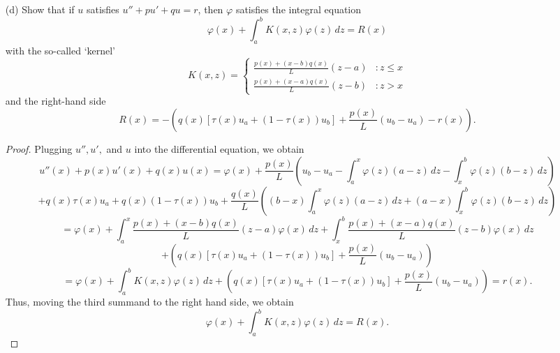 \documentclass[10pt]{article}
\begin{document}
\begin{itemize}
\item[(d)] Show that if $ u $ satisfies $ u'' + p u' + q u = r  $, then $ \varphi $ satisfies the integral equation  $$
\varphi(x) + \int_{a}^b K(x,z) \varphi(z) \, dz = R(x)
$$ with the so-called `kernel'
 \begin{displaymath}
   K(x,z) = \left\{
     \begin{array}{lr}
       \frac{p(x) + (x - b)q(x)}{L} (z - a) & : z \leq x \\
       \frac{p(x) + (x - a)q(x)}{L} (z - b) & : z > x
     \end{array}
   \right.
\end{displaymath} and the right-hand side $$
R(x) = -\left( q(x)[ \tau(x) u_a + (1 - \tau(x)) u_b ] + \frac{p(x)}{L} ( u_b - u_a ) - r(x)  \right).
$$
\begin{proof}
Plugging $ u'', u', $ and $u$ into the differential equation, we obtain $$
u''(x) + p(x) u'(x) + q(x) u(x)  = \varphi(x) + \frac{p(x)}{L}  \left( u_b - u_a - \int_a^x \varphi(z)(a - z) \, dz - \int_x^b  \varphi(z)(b - z) \, dz \right) $$ $$ + q(x)\tau(x) u_a + q(x)(1 - \tau(x)) u_b + \frac{q(x)}{L} \left( (b - x) \int_a^x \varphi(z) ( a - z ) \, dz +  (a - x) \int_x^b \varphi(z) ( b - z ) \, dz  \right) $$ $$
= \varphi(x) + \int_a^x  \frac{p(x) + (x - b)q(x)}{L} (z - a) \varphi(x) \, dz
+ \int_x^b  \frac{p(x) + (x - a)q(x)}{L} (z - b) \varphi(x) \, dz
$$ $$
+ \left( q(x)[ \tau(x) u_a + (1 - \tau(x)) u_b ] + \frac{p(x)}{L} ( u_b - u_a )  \right)
$$ $$
= \varphi(x) + \int_a^b K(x,z) \varphi(z) \, dz + \left( q(x)[ \tau(x) u_a + (1 - \tau(x)) u_b ] + \frac{p(x)}{L} ( u_b - u_a )  \right) = r(x).
$$ Thus, moving the third summand to the right hand side, we obtain $$
\varphi(x) + \int_{a}^b K(x,z) \varphi(z) \, dz = R(x).
$$
\end{proof}
\end{itemize}

\newpage

\end{document}
